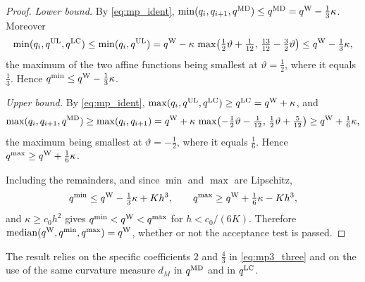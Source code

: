 \documentclass[a4paper,fleqn]{cas-sc}
\theoremstyle{remark}
\begin{document}
\begin{proof}
\emph{Lower bound.} By \eqref{eq:mp_ident},
$\min(q_i,q_{i+1},q^{\rm MD})\le q^{\rm MD}=q^{\rm W}-\tfrac13\kappa$.
Moreover
\[
\min(q_i,q^{\rm UL},q^{\rm LC})\le\min(q_i,q^{\rm UL})
=q^{\rm W}-\kappa\,\max\bigl(\tfrac12\vartheta+\tfrac1{12},\,
\tfrac{13}{12}-\tfrac32\vartheta\bigr)\le q^{\rm W}-\tfrac13\kappa ,
\]
the maximum of the two affine functions being smallest at
$\vartheta=\tfrac12$, where it equals $\tfrac13$. Hence
$q^{\min}\le q^{\rm W}-\tfrac13\kappa$.
 
\emph{Upper bound.} By \eqref{eq:mp_ident},
$\max(q_i,q^{\rm UL},q^{\rm LC})\ge q^{\rm LC}=q^{\rm W}+\kappa$, and
\[
\max(q_i,q_{i+1},q^{\rm MD})\ge\max(q_i,q_{i+1})
=q^{\rm W}+\kappa\,\max\bigl(-\tfrac12\vartheta-\tfrac1{12},\,
\tfrac12\vartheta+\tfrac5{12}\bigr)\ge q^{\rm W}+\tfrac16\kappa ,
\]
the maximum being smallest at $\vartheta=-\tfrac12$, where it equals
$\tfrac16$. Hence $q^{\max}\ge q^{\rm W}+\tfrac16\kappa$.
 
Including the remainders, and since $\min$ and $\max$ are Lipschitz,
\[
q^{\min}\le q^{\rm W}-\tfrac13\kappa+Kh^3,\qquad
q^{\max}\ge q^{\rm W}+\tfrac16\kappa-Kh^3 ,
\]
and $\kappa\ge c_0h^2$ gives $q^{\min}<q^{\rm W}<q^{\max}$ for
$h<c_0/(6K)$. Therefore
$\operatorname{median}(q^{\rm W},q^{\min},q^{\max})=q^{\rm W}$, whether or
not the acceptance test is passed.
\end{proof}
 
\noindent The result relies on the specific coefficients $2$ and $\tfrac43$
in \eqref{eq:mp3_three} and on the use of the same curvature measure $d_M$ in
$q^{\rm MD}$ and in $q^{\rm LC}$.
\end{document}
